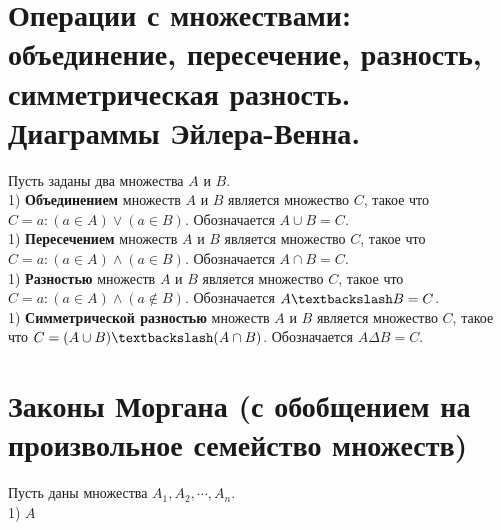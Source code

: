 \documentclass[a4paper,11pt]{report}
\begin{document}
\section{Операции с множествами: объединение, пересечение, разность, 
симметрическая разность. Диаграммы Эйлера-Венна.}
Пусть заданы два множества $A$ и $B$.\\
1) \textbf{Объединением} множеств $A$ и $B$ является множество $C$, такое что
$C = {a : (a \in A) \vee (a \in B)}$. Обозначается $A \cup B = C$.\\
1) \textbf{Пересечением} множеств $A$ и $B$ является множество $C$, такое что
$C = {a : (a \in A) \wedge (a \in B)}$. Обозначается $A \cap B = C$.\\
1) \textbf{Разностью} множеств $A$ и $B$ является множество $C$, такое что
$C = {a : (a \in A) \wedge (a \notin B)}$. Обозначается $A \textbackslash B = C$.\\
1) \textbf{Симметрической разностью} множеств $A$ и $B$ является множество $C$, такое что
$C = (A \cup B)\textbackslash(A \cap B)$. Обозначается $A \Delta B = C$.\\
\section{Законы Моргана (с обобщением на произвольное семейство множеств)}
Пусть даны множества $A_1, A_2, \cdots, A_n$.\\
1) $A$
\end{document}
